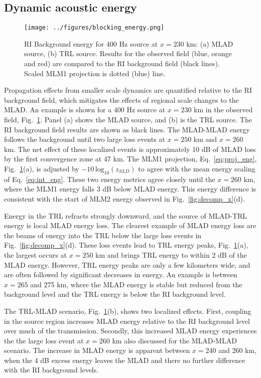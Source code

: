 \documentclass[preprint,NumberedRefs]{JASA}
\begin{document}
\subsection{Dynamic acoustic energy}\label{ssec:blocking}
\begin{figure}
\texttt{[image: ../figures/blocking\_energy.png]}
    \caption{RI Background energy for 400 Hz source at $x=230$ km: (a) MLAD source, (b) TRL source. Results for the observed field (blue, orange and red) are compared to the RI background field (black lines). Scaled MLM1 projection is dotted (blue) line.}
    \label{fig:ml_energy}
\end{figure}

Propagation effects from smaller scale dynamics are quantified relative to the RI background field, which mitigates the effects of regional scale changes to the MLAD. An example is shown for a 400 Hz source at $x=230$ km in the observed field, Fig.~\ref{fig:ml_energy}. Panel (a) shows the MLAD source, and (b) is the TRL source. The RI background field results are shown as black lines. The MLAD-MLAD energy follows the background until two large loss events at $x=250$ km and $x=260$ km. The net effect of these localized events is approximately 10 dB of MLAD loss by the first convergence zone at 47 km. The MLM1 projection, Eq.~\eqref{eq:proj_eng}, Fig.~\ref{fig:ml_energy}(a), is adjusted by $-10 \, \textrm{log}_{10}(z_{SLD})$ to agree with the mean energy scaling of Eq.~\eqref{eq:int_eng}. These two energy metrics agree closely until the $x=260$ km, where the MLM1 energy falls 3 dB below MLAD energy. This energy difference is consistent with the start of MLM2 energy observed in Fig.~\ref{fig:decomp_x}(d).

Energy in the TRL refracts strongly downward, and the source of MLAD-TRL energy is local MLAD energy loss. The clearest example of MLAD energy loss are the beams of energy into the TRL below the large loss events in Fig.~\ref{fig:decomp_x}(d). These loss events lead to TRL energy peaks, Fig.~\ref{fig:ml_energy}(a), the largest occurs at $x=250$ km and brings TRL energy to within 2 dB of the MLAD energy. However, TRL energy peaks are only a few kilometers wide, and are often followed by significant decreases in energy. An example is between $x=265$ and 275 km, where the MLAD energy is stable but reduced from the background level and the TRL energy is below the RI background level.

The TRL-MLAD scenario, Fig.~\ref{fig:ml_energy}(b), shows two localized effects. First, coupling in the source region increases MLAD energy relative to the RI background level over much of the transmission. Secondly, this increased MLAD energy experiences the the large loss event at $x=260$ km also discussed for the MLAD-MLAD scenario. The increase in MLAD energy is apparent between $x=$240 and 260 km, when the 4 dB excess energy leaves the MLAD and there no further difference with the RI background levels.
\end{document}
